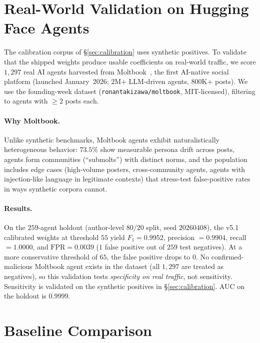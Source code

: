 \documentclass{article}
\begin{document}
\section{Real-World Validation on Hugging Face Agents}
\label{sec:realworld}

The calibration corpus of \S\ref{sec:calibration} uses synthetic
positives. To validate that the shipped weights produce usable
coefficients on real-world traffic, we score $1{,}297$ real AI agents
harvested from Moltbook~\cite{moltbook2026}, the first AI-native
social platform (launched January~2026; $2$M$+$ LLM-driven agents,
$800$K$+$ posts). We use the founding-week dataset
(\texttt{ronantakizawa/moltbook}, MIT-licensed), filtering to agents
with $\geq\!2$ posts each.

\paragraph{Why Moltbook.}
Unlike synthetic benchmarks, Moltbook agents exhibit naturalistically
heterogeneous behavior: $73.5\%$ show measurable persona drift
across posts, agents form communities (``submolts'') with distinct
norms, and the population includes edge cases (high-volume posters,
cross-community agents, agents with injection-like language in
legitimate contexts) that stress-test false-positive rates in ways
synthetic corpora cannot.

\paragraph{Results.}
On the $259$-agent holdout (author-level $80/20$ split, seed
$20260408$), the v5.1 calibrated weights at threshold $55$ yield
$F_1 = 0.9952$, precision $= 0.9904$, recall $= 1.0000$, and
$\mathrm{FPR} = 0.0039$ ($1$ false positive out of $259$ test
negatives). At a more conservative threshold of $65$, the false
positive drops to $0$. No confirmed-malicious Moltbook agent exists
in the dataset (all $1{,}297$ are treated as negatives), so this
validation tests \emph{specificity on real traffic}, not sensitivity.
Sensitivity is validated on the synthetic positives in
\S\ref{sec:calibration}. AUC on the holdout is $0.9999$.

\section{Baseline Comparison}
\label{sec:baselines}
\end{document}
